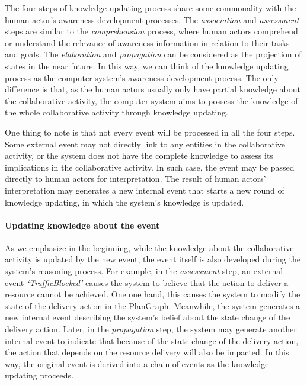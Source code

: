 The four steps of knowledge updating process share some commonality with the human actor's awareness development processes. The \emph{association} and \emph{assessment} steps are similar to the \emph{comprehension} process, where human actors comprehend or understand the relevance of awareness information in relation to their tasks and goals. The \emph{elaboration} and \emph{propagation} can be considered as the projection of states in the near future. In this way, we can think of the knowledge updating process as the computer system's awareness development process. The only difference is that, as the human actors usually only have partial knowledge about the collaborative activity, the computer system aims to possess the knowledge of the whole collaborative activity through knowledge updating.

One thing to note is that not every event will be processed in all the four steps. Some external event may not directly link to any entities in the collaborative activity, or the system does not have the complete knowledge to assess its implications in the collaborative activity. In such case, the event may be passed directly to human actors for interpretation. The result of human actors' interpretation may generates a new internal event that starts a new round of knowledge updating, in which the system's knowledge is updated.

\paragraph*{Updating knowledge about the event} %
\label{par:updating_the_event_representation}
As we emphasize in the beginning, while the knowledge about the collaborative activity is updated by the new event, the event itself is also developed during the system's reasoning process. For example, in the \emph{assessment} step, an external event \emph{`TrafficBlocked'} causes the system to believe that the action to deliver a resource cannot be achieved. One one hand, this causes the system to modify the state of the delivery action in the PlanGraph. Meanwhile, the system generates a new internal event describing the system's belief about the state change of the delivery action. Later, in the \emph{propagation} step, the system may generate another internal event to indicate that because of the state change of the delivery action, the action that depends on the resource delivery will also be impacted. In this way, the original event is derived into a chain of events as the knowledge updating proceeds.

